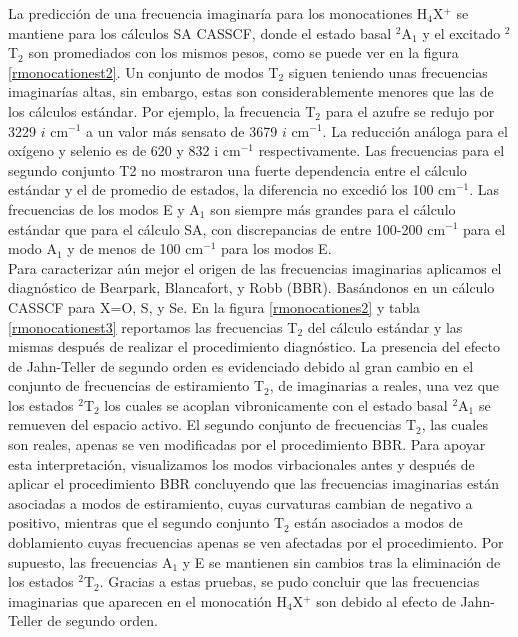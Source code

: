 \documentclass[12pt]{report}
\begin{document}
La predicción de una frecuencia imaginaría para los monocationes H$_4$X$^+$ se mantiene para los cálculos SA CASSCF, donde el estado basal $^2$A$_1$ y el excitado $^2$T$_2$ son promediados con los mismos pesos, como se puede ver en la figura \ref{rmonocationest2}. Un conjunto de modos T$_2$ siguen teniendo unas frecuencias imaginarías altas, sin embargo, estas son considerablemente menores que las de los cálculos estándar. Por ejemplo, la frecuencia T$_2$ para el azufre se redujo por 3229 $i$ cm$^{-1}$ a un valor más sensato de 3679 $i$ cm$^{-1}$.  La reducción análoga para el oxígeno y selenio es de 620 y 832 i cm$^{-1}$ respectivamente. Las frecuencias para el segundo conjunto T2 no mostraron una fuerte dependencia entre el cálculo estándar y el de promedio de estados, la diferencia no excedió los 100 cm$^{-1}$. Las frecuencias de los modos E y A$_1$ son siempre más grandes para el cálculo estándar que para el cálculo SA, con discrepancias de entre 100-200 cm$^{-1}$ para el modo A$_1$ y de menos de 100 cm$^{-1}$ para los modos E.
\\


Para caracterizar aún mejor el origen de las frecuencias imaginarias aplicamos el diagnóstico de Bearpark, Blancafort, y Robb (BBR). Basándonos en un cálculo CASSCF para X=O, S, y Se. En la figura \ref{rmonocationes2} y tabla \ref{rmonocationest3} reportamos las frecuencias T$_2$ del cálculo estándar y las mismas después de realizar el procedimiento diagnóstico. La presencia del efecto de Jahn-Teller de segundo orden es evidenciado debido al gran cambio en el conjunto de frecuencias de estiramiento T$_2$, de imaginarias a reales, una vez que los estados $^2$T$_2$ los cuales se acoplan vibronicamente con el estado basal $^2$A$_1$ se remueven del espacio activo. El segundo conjunto de frecuencias T$_2$, las cuales son reales, apenas se ven modificadas por el procedimiento BBR. Para apoyar esta interpretación, visualizamos los modos virbacionales antes y después de aplicar el procedimiento BBR concluyendo que las frecuencias imaginarias están asociadas a modos de estiramiento, cuyas curvaturas cambian de negativo a positivo, mientras que el segundo conjunto T$_2$ están asociados a modos de doblamiento cuyas frecuencias apenas se ven afectadas por el procedimiento. Por supuesto, las frecuencias A$_1$ y E se mantienen sin cambios tras la eliminación de los estados $^2$T$_2$. Gracias a estas pruebas, se pudo concluir que las frecuencias imaginarias que aparecen en el monocatión H$_4$X$^+$ son debido al efecto de Jahn-Teller de segundo orden.
\end{document}
